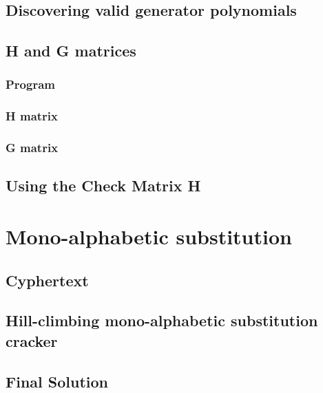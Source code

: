 \documentclass[pdftex, 11pt, a4paper]{article}
\begin{document}
\subsection{Discovering valid generator polynomials}\label{hammgen}

\pagebreak

\subsection{H and G matrices}
\subsubsection{Program}\label{hammgen-hg}

\subsubsection{H matrix}\label{h-matrix}
\subsubsection{G matrix}\label{g-matrix}
\pagebreak

\subsection{Using the Check Matrix H}\label{check-matrix}

\pagebreak

\section{Mono-alphabetic substitution}
\subsection{Cyphertext}\label{q3-cyphertext}

\subsection{Hill-climbing mono-alphabetic substitution cracker}\label{break-simplesub}

\pagebreak

\subsection{Final Solution}\label{q3-solution}
\pagebreak
\end{document}
